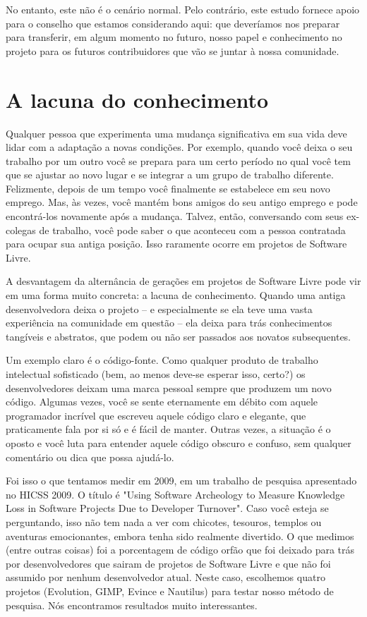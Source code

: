 No entanto, este não é o cenário normal. Pelo contrário, este estudo fornece
apoio para o conselho que estamos considerando aqui: que deveríamos nos
preparar para transferir, em algum momento no futuro, nosso papel e conhecimento no
projeto para os futuros contribuidores que vão se juntar à nossa comunidade.

\section*{A lacuna do conhecimento}

Qualquer pessoa que experimenta uma mudança significativa em sua vida deve lidar
com a adaptação a novas condições. Por exemplo, quando você deixa o seu trabalho
por um outro você se prepara para um certo período no qual você tem que se ajustar
ao novo lugar e se integrar a um grupo de trabalho diferente. Felizmente, depois de
um tempo você finalmente se estabelece em seu novo emprego. Mas, às vezes, você
mantém bons amigos do seu antigo emprego e pode encontrá-los novamente após
a mudança. Talvez, então, conversando com seus ex-colegas de trabalho, você pode saber
o que aconteceu com a pessoa contratada para ocupar sua antiga posição. Isso raramente ocorre em
projetos de Software Livre.

A desvantagem da alternância de gerações em projetos de Software Livre pode
vir em uma forma muito concreta: a lacuna de conhecimento. Quando uma
antiga desenvolvedora deixa o projeto -- e especialmente se ela teve uma vasta experiência
na comunidade em questão -- ela deixa para trás conhecimentos tangíveis e abstratos,
que podem ou não ser passados aos novatos subsequentes.

Um exemplo claro é o código-fonte. Como qualquer produto de trabalho intelectual sofisticado
(bem, ao menos deve-se esperar isso, certo?) os desenvolvedores deixam uma marca
pessoal sempre que produzem um novo código. Algumas vezes, você se sente eternamente
em débito com aquele programador incrível que escreveu aquele código claro e elegante, que praticamente
fala por si só e é fácil de manter. Outras vezes, a situação é o oposto e você luta
para entender aquele código obscuro e confuso, sem qualquer comentário ou dica
que possa ajudá-lo.

Foi isso o que tentamos medir em 2009, em um trabalho de pesquisa apresentado no HICSS
2009. O título é "Using Software Archeology to Measure Knowledge Loss in
Software Projects Due to Developer Turnover". Caso você esteja se perguntando, isso não
tem nada a ver com chicotes, tesouros, templos ou aventuras emocionantes, embora
tenha sido realmente divertido. O que medimos (entre outras coisas) foi a porcentagem
de código orfão que foi deixado para trás por desenvolvedores que sairam de projetos de Software
Livre e que não foi assumido por nenhum desenvolvedor atual. Neste caso,
escolhemos quatro projetos (Evolution, GIMP, Evince e Nautilus) para testar nosso método
de pesquisa. Nós encontramos resultados muito interessantes.

